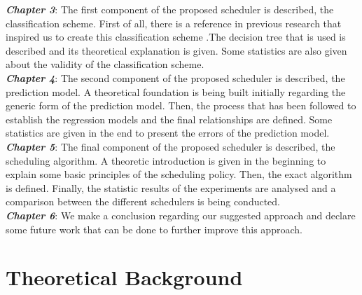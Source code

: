 \documentclass[diploma]{Styles/softlab-thesis}
\begin{document}
\textbf{\emph{Chapter 3}}: The first component of the proposed scheduler is described, the classification scheme. First of all, there is a reference in previous research that inspired us to create this classification scheme .The decision tree that is used is described and its theoretical explanation is given. Some statistics are also given about the validity of the classification scheme. \\

\textbf{\emph{Chapter 4}}: The second component of the proposed scheduler is described, the prediction model. A theoretical foundation is being built initially regarding the generic form of the prediction model. Then, the process that has been followed to establish the regression models and the final relationships are defined. Some statistics are given in the end to present the errors of the prediction model. \\

\textbf{\emph{Chapter 5}}: The final component of the proposed scheduler is described, the scheduling algorithm. A theoretic introduction is given in the beginning to explain some basic principles of the scheduling policy. Then, the exact algorithm is defined. Finally, the statistic results of the experiments are analysed and a comparison between the different schedulers is being conducted. \\ 

\textbf{\emph{Chapter 6}}: We make a conclusion regarding our suggested approach and declare some future work that can be done to further improve this approach. \\


\chapter{Theoretical Background}
\end{document}
